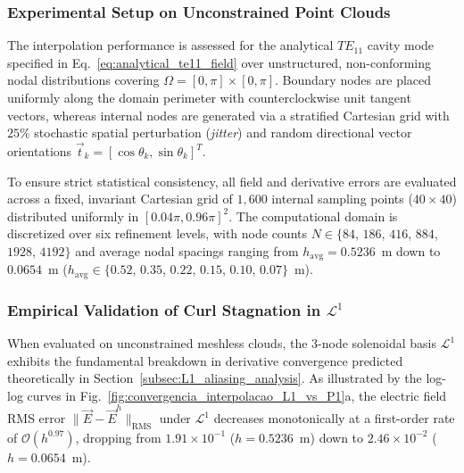 \documentclass[preprint,12pt]{elsarticle}
\begin{document}
\subsubsection{Experimental Setup on Unconstrained Point Clouds}
The interpolation performance is assessed for the analytical $TE_{11}$ cavity mode specified in Eq.~\eqref{eq:analytical_te11_field} over unstructured, non-conforming nodal distributions covering $\Omega = [0, \pi] \times [0, \pi]$. Boundary nodes are placed uniformly along the domain perimeter with counterclockwise unit tangent vectors, whereas internal nodes are generated via a stratified Cartesian grid with $25\%$ stochastic spatial perturbation (\textit{jitter}) and random directional vector orientations $\vec{t}_k = [\cos\theta_k, \sin\theta_k]^T$.

To ensure strict statistical consistency, all field and derivative errors are evaluated across a fixed, invariant Cartesian grid of $1{,}600$ internal sampling points ($40 \times 40$) distributed uniformly in $[0.04\pi, 0.96\pi]^2$. The computational domain is discretized over six refinement levels, with node counts $N \in \{84$, $186$, $416$, $884$, $1928$, $4192\}$ and average nodal spacings ranging from $h_{\mathrm{avg}} = 0.5236$~m down to $0.0654$~m ($h_{\mathrm{avg}} \in \{0.52$, $0.35$, $0.22$, $0.15$, $0.10$, $0.07\}$~m).

\subsubsection{Empirical Validation of Curl Stagnation in $\mathcal{L}^1$}
When evaluated on unconstrained meshless clouds, the 3-node solenoidal basis $\mathcal{L}^1$ exhibits the fundamental breakdown in derivative convergence predicted theoretically in Section~\ref{subsec:L1_aliasing_analysis}. As illustrated by the log-log curves in Fig.~\ref{fig:convergencia_interpolacao_L1_vs_P1}a, the electric field RMS error $\|\vec{E} - \vec{E}^h\|_{\mathrm{RMS}}$ under $\mathcal{L}^1$ decreases monotonically at a first-order rate of $\mathcal{O}(h^{0.97})$, dropping from $1.91 \times 10^{-1}$ ($h = 0.5236$~m) down to $2.46 \times 10^{-2}$ ($h = 0.0654$~m).
\end{document}
